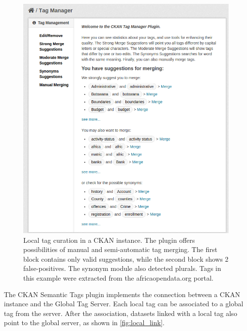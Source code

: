 \documentclass[conference]{IEEEtran}
\begin{document}
\begin{figure}[tb]
\begin{center}
\includegraphics[width=\columnwidth]{images/local_curation.png}
\caption{Local tag curation in a CKAN instance. The plugin offers possibilities of manual and semi-automatic tag merging. The first block contains only valid suggestions, while the second block shows 2 false-positives. The synonym module also detected plurals. Tags in this example were extracted from the africaopendata.org portal.}
\label{fig:local_curation}
\end{center}
\end{figure}

The CKAN Semantic Tags plugin implements the connection between a CKAN instance and the Global Tag Server.
Each local tag can be associated to a global tag from the server.
After the association, datasets linked with a local tag also point to the global server, as shown in \autoref{fig:local_link}.
\end{document}
